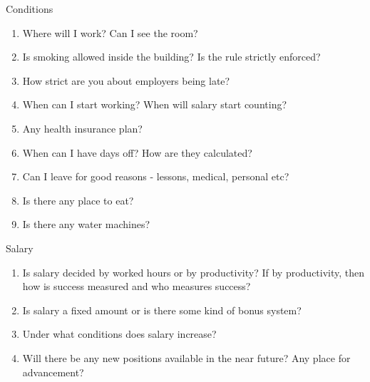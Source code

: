 \documentclass{article}
\begin{document}

\item Conditions
	\begin{enumerate}
		\item Where will I work? Can I see the room?
		\item Is smoking allowed inside the building? Is the rule strictly enforced?
		\item How strict are you about employers being late?
		\item When can I start working? When will salary start counting?
		\item Any health insurance plan?
		\item When can I have days off? How are they calculated?
		\item Can I leave for good reasons - lessons, medical, personal etc?
		\item Is there any place to eat?
		\item Is there any water machines?
	\end{enumerate}

\item Salary
	\begin{enumerate}
		\item Is salary decided by worked hours or by productivity? If by productivity, then how is success measured and who measures success?
		\item Is salary a fixed amount or is there some kind of bonus system?
		\item Under what conditions does salary increase?
		\item Will there be any new positions available in the near future? Any place for advancement?
	\end{enumerate}
\end{document}
